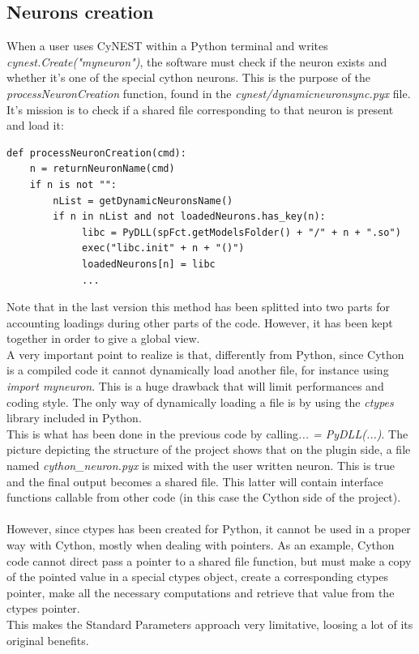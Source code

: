 \documentclass{article}
\begin{document}
\subsection{Neurons creation}
When a user uses CyNEST within a Python terminal and writes \emph{cynest.Create("myneuron")}, the software must check if the neuron exists and whether it's one of the special cython neurons. This is the purpose of the \emph{processNeuronCreation} function, found in the \emph{cynest/dynamicneuronsync.pyx} file. It's mission is to check if a shared file corresponding to that neuron is present and load it:
\begin{verbatim}
def processNeuronCreation(cmd):
    n = returnNeuronName(cmd)
    if n is not "":
        nList = getDynamicNeuronsName()
        if n in nList and not loadedNeurons.has_key(n):
             libc = PyDLL(spFct.getModelsFolder() + "/" + n + ".so")
             exec("libc.init" + n + "()")
             loadedNeurons[n] = libc
             ...
\end{verbatim}
Note that in the last version this method has been splitted into two parts for accounting loadings during other parts of the code. However, it has been kept together in order to give a global view.\\
A very important point to realize is that, differently from Python, since Cython is a compiled code it cannot dynamically load another file, for instance using \emph{import myneuron}. This is a huge drawback that will limit performances and coding style. The only way of dynamically loading a file is by using the \emph{ctypes} library included in Python.\\
This is what has been done in the previous code by calling\emph{... = PyDLL(...)}. The picture depicting the structure of the project shows that on the plugin side, a file named \emph{cython\_neuron.pyx} is mixed with the user written neuron. This is true and the final output becomes a shared file. This latter will contain interface functions callable from other code (in this case the Cython side of the project).\\ \\
However, since ctypes has been created for Python, it cannot be used in a proper way with Cython, mostly when dealing with pointers. As an example, Cython code cannot direct pass a pointer to a shared file function, but must make a copy of the pointed value in a special ctypes object, create a corresponding ctypes pointer, make all the necessary computations and retrieve that value from the ctypes pointer.\\ 
This makes the Standard Parameters approach very limitative, loosing a lot of its original benefits.
\end{document}
